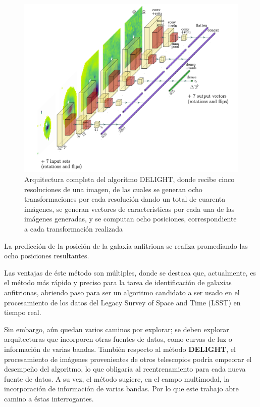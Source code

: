 \documentclass[../tesis.tex]{subfiles}
\begin{document}
\begin{figure}[ht!]
    \centering
    \includegraphics[width=0.7\linewidth]{images/introduction/delight_full_arch.png}
    \caption{Arquitectura completa del algoritmo DELIGHT, donde recibe cinco resoluciones de una imagen, de las cuales se generan ocho transformaciones por cada resolución dando un total de cuarenta imágenes, se generan vectores de características por cada una de las imágenes generadas, y se computan ocho posiciones, correspondiente a cada transformación realizada}
    \label{fig:delight-full}
\end{figure}

La predicción de la posición de la galaxia anfitriona se realiza promediando las ocho posiciones resultantes.\par\null\par

Las ventajas de éste método son múltiples, donde se destaca que, actualmente, es el método más rápido y preciso para la tarea de identificación de galaxias anfitrionas, abriendo paso para ser un algoritmo candidato a ser usado en el procesamiento de los datos del Legacy Survey of Space and Time (LSST) en tiempo real.\par\null\par

Sin embargo, aún quedan varios caminos por explorar; se deben explorar arquitecturas que incorporen otras fuentes de datos, como curvas de luz o información de varias bandas. También respecto al método \textbf{DELIGHT}, el procesamiento de imágenes provenientes de otros telescopios podría empeorar el desempeño del algoritmo, lo que obligaría al reentrenamiento para cada nueva fuente de datos. A su vez, el método sugiere, en el campo multimodal, la incorporación de información de varias bandas. Por lo que este trabajo abre camino a éstas interrogantes. \par\null\par
\end{document}
